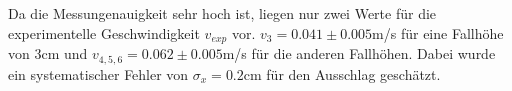 Da die Messungenauigkeit sehr hoch ist, liegen nur zwei Werte für die experimentelle Geschwindigkeit $v_{exp}$ vor. $v_{3}=0.041 \pm 0.005$\;m/s für eine Fallhöhe von 3\;cm und $v_{4,5,6}=0.062\pm 0.005 $\;m/s für die anderen Fallhöhen. Dabei wurde ein systematischer Fehler von $\sigma_{x}=0.2$\;cm für den Ausschlag geschätzt.
